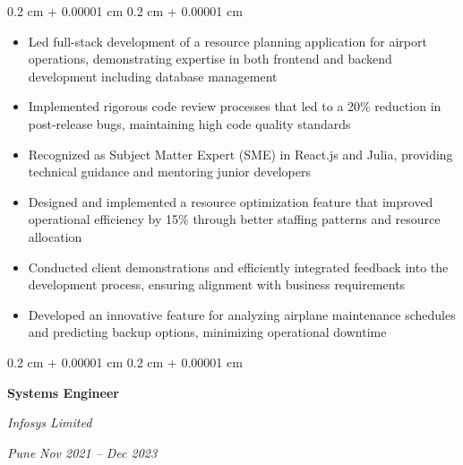 \documentclass[10pt, letterpaper]{article}
\newenvironment{highlights}{
    \begin{itemize}[
        topsep=0.10 cm,
        parsep=0.10 cm,
        partopsep=0pt,
        itemsep=0pt,
        leftmargin=0.4 cm + 10pt
    ]
}{
    \end{itemize}
}
\newenvironment{onecolentry}{
    \begin{adjustwidth}{
        0.2 cm + 0.00001 cm
    }{
        0.2 cm + 0.00001 cm
    }
}{
    \end{adjustwidth}
}
\newenvironment{twocolentry}[2][]{
    \onecolentry
    \def\secondColumn{#2}
    \setcolumnwidth{\fill, 4.5 cm}
    \begin{paracol}{2}
}{
    \switchcolumn \raggedleft \secondColumn
    \end{paracol}
    \endonecolentry
}
\begin{document}
        \vspace{0.10 cm}
        \begin{onecolentry}
            \begin{highlights}
                \item Led full-stack development of a resource planning application for airport operations, demonstrating expertise in both frontend and backend development including database management
                \item Implemented rigorous code review processes that led to a 20\% reduction in post-release bugs, maintaining high code quality standards
                \item Recognized as Subject Matter Expert (SME) in React.js and Julia, providing technical guidance and mentoring junior developers
                \item Designed and implemented a resource optimization feature that improved operational efficiency by 15\% through better staffing patterns and resource allocation
                \item Conducted client demonstrations and efficiently integrated feedback into the development process, ensuring alignment with business requirements
                \item Developed an innovative feature for analyzing airplane maintenance schedules and predicting backup options, minimizing operational downtime
            \end{highlights}
        \end{onecolentry}

        \vspace{0.2 cm}

        \begin{twocolentry}{
        \textit{Pune}    
        \textit{Nov 2021 – Dec 2023}}
            \textbf{Systems Engineer}
            
            \textit{Infosys Limited}
        \end{twocolentry}
\end{document}
